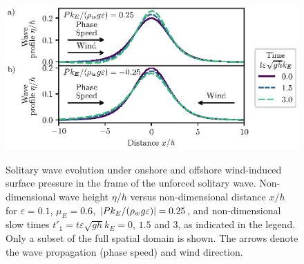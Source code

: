 \documentclass{jfm}
\renewcommand*{\epsilon}{\varepsilon}
\begin{document}
\begin{figure}
  \centering
  { %
    \label{fig:snapshots_solitary:a}
    \label{fig:snapshots_solitary:b}
  }
  \includegraphics{Snapshots-Positive-Negative-Production.eps}
  \vspace{-0.25cm}
  \caption{
    Solitary wave evolution under
    onshore and
    offshore wind-induced surface pressure in the frame of the unforced
    solitary wave.
    Non-dimensional wave height $\eta/h$ versus
    non-dimensional distance $x/h$ for $\epsilon=0.1$,
    $\mu_E = 0.6$, $\abs{P k_E/(\rho_w g \epsilon)} = 0.25$, and
    non-dimensional slow times $t'_1 = t \epsilon \sqrt{gh} k_E = 0$,
    $1.5$ and $3$, as indicated in the legend.
    Only a subset of the full spatial domain is shown.
    The arrows denote the wave propagation (phase speed) and wind
    direction.
  }\label{fig:snapshots_solitary}
\end{figure}
\end{document}
